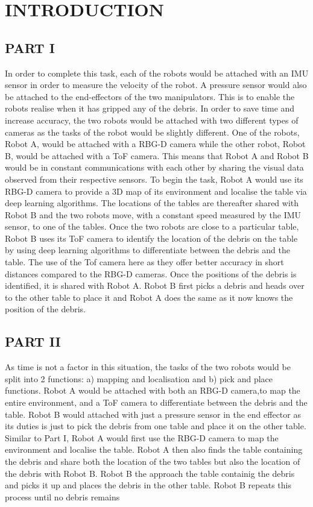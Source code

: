 \section{INTRODUCTION}\label{Sec:intro}

\subsection*{PART I}
In order to complete this task, each of the robots would be attached with an IMU sensor in order to measure the velocity of the robot. A pressure sensor would also be attached to the end-effectors of the two manipulators. This is to enable the robots realise when it has gripped any of the debris. In order to save time and increase accuracy, the two robots would be attached with two different types of cameras as the tasks of the robot would be slightly different. One of the robots, Robot A, would be attached with a RBG-D camera while the other robot, Robot B, would be attached with a ToF camera. This means that Robot A and Robot B would be in constant communications with each other by sharing the visual data observed from their respective sensors. 
To begin the task, Robot A would use its RBG-D camera to provide a 3D map of its environment and localise the table via deep learning algorithms. The locations of the tables are thereafter shared with Robot B and the two robots move, with a constant speed measured by the IMU sensor, to one of the tables. Once the two robots are close to a particular table, Robot B uses its ToF camera to identify the location of the debris on the table by using deep learning algorithms to differentiate between the debris and the table. The use of the Tof camera here as they offer better accuracy in short distances compared to the RBG-D cameras. Once the positions of the debris is identified, it is shared with Robot A. Robot B first picks a debris and heads over to the other table to place it and Robot A does the same as it now knows the position of the debris.

\subsection*{PART II}
As time is not a factor in this situation, the tasks of the two robots would be split into 2 functions: a) mapping and localisation and b) pick and place functions. Robot A would be attached with both an RBG-D camera,to map the entire environment, and a ToF camera to differentiate between the debris and the table. Robot B would attached with just a pressure sensor in the end effector as its duties is just to pick the debris from one table and place it on the other table. Similar to Part I, Robot A would first use the RBG-D camera to map the environment and localise the table. Robot A then also finds the table containing the debris and share both the location of the two tables but also the location of the debris with Robot B. Robot B the approach the table containig the debris and picks it up and places the debris in the other table. Robot B repeats this process until no debris remains